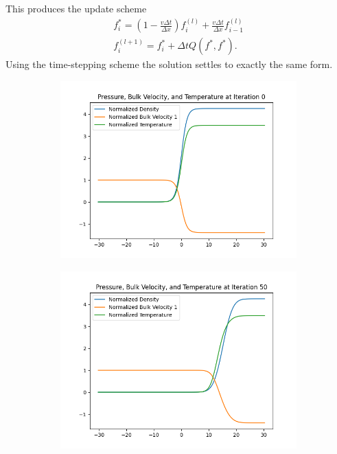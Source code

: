 \documentclass{article}
\begin{document}
This produces the update scheme
\begin{gather*}
    f_i^* = \left(1 - \frac{v \Delta t}{\Delta x} \right)f_i^{(l)} + \frac{v \Delta t}{\Delta x}  f_{i-1}^{(l)}\\
    f_i^{(l+1)} = f^*_i + \Delta t Q(f^*,f^*).
\end{gather*}
Using the time-stepping scheme the solution settles to exactly the same form.
\begin{figure}[H]
    \centering
    \begin{subfigure}[b]{0.45\textwidth}
    \includegraphics[width=\textwidth]{imgs/time_stepping/iter0.png}
        \label{fig:image1}
    \end{subfigure}
    \hfill
    \begin{subfigure}[b]{0.45\textwidth}
    \includegraphics[width=\textwidth]{imgs/time_stepping/iter50.png}
        \label{fig:image2}
    \end{subfigure}
    

\end{figure}
\end{document}
